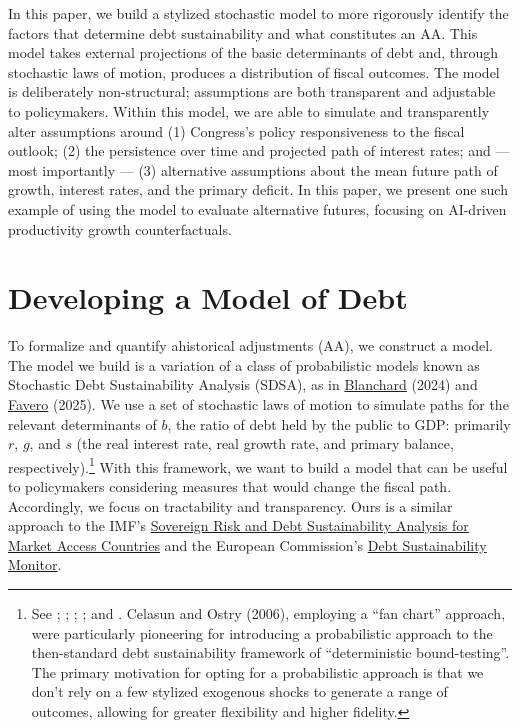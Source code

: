 \documentclass[12pt]{article}
\begin{document}
In this paper, we build a stylized stochastic model to more rigorously identify the factors that determine debt sustainability and what constitutes an AA. This model takes external projections of the basic determinants of debt and, through stochastic laws of motion, produces a distribution of fiscal outcomes. The model is deliberately non-structural; assumptions are both transparent and adjustable to policymakers. Within this model, we are able to simulate and transparently alter assumptions around (1) Congress's policy responsiveness to the fiscal outlook; (2) the persistence over time and projected path of interest rates; and --- most importantly --- (3) alternative assumptions about the mean future path of growth, interest rates, and the primary deficit. In this paper, we present one such example of using the model to evaluate alternative futures, focusing on AI-driven productivity growth counterfactuals. 

\section{Developing a Model of Debt}

To formalize and quantify ahistorical adjustments (AA), we construct a model. The model we build is a variation of a class of probabilistic models known as Stochastic Debt Sustainability Analysis (SDSA), as in \href{https://direct.mit.edu/books/oa-monograph/5522/Fiscal-Policy-under-Low-Interest-Rates}{Blanchard} (2024) and \href{https://didattica.unibocconi.it/mypage/dwload.php?nomefile=Fiscal_Macro_2025_(3)20250403120402.pdf}{Favero} (2025). We use a set of stochastic laws of motion to simulate paths for the relevant determinants of $b$, the ratio of debt held by the public to GDP: primarily $r$, $g$, and $s$ (the real interest rate, real growth rate, and primary balance, respectively).\footnote{See \textcite{celasun_2006}; \textcite{cottarelli_2011}; \textcite{berti_2013}; \textcite{demirel_2022}; and \textcite{auerbach2025robust}. Celasun and Ostry (2006), employing a ``fan chart'' approach, were particularly pioneering for introducing a probabilistic approach to the then-standard debt sustainability framework of ``deterministic bound-testing''. The primary motivation for opting for a probabilistic approach is that we don't rely on a few stylized exogenous shocks to generate a range of outcomes, allowing for greater flexibility and higher fidelity.}  With this framework, we want to build a model that can be useful to policymakers considering measures that would change the fiscal path. Accordingly, we focus on tractability and transparency. Ours is a similar approach to the IMF's \href{https://www.imf.org/en/Publications/DSA/sovereign-risk-and-debt-sustainability-analysis-for-market-access-countries}{Sovereign Risk and Debt Sustainability Analysis for Market Access Countries} and the European Commission's \href{https://economy-finance.ec.europa.eu/publications/debt-sustainability-monitor-2024_en}{Debt Sustainability Monitor}.
\end{document}
